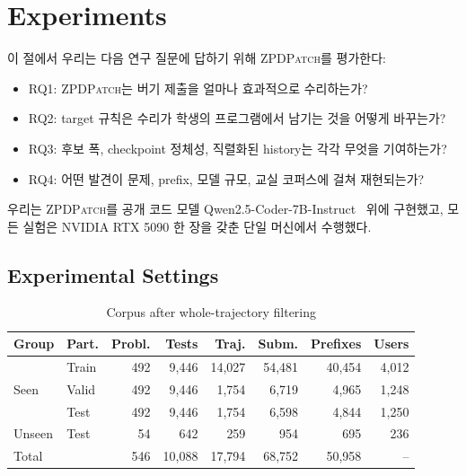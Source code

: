 \documentclass[10pt,conference]{IEEEtran}
\begin{document}
\section{Experiments}
\label{sec:experiment}
이 절에서 우리는 다음 연구 질문에 답하기 위해 \textsc{ZPDPatch}를 평가한다:
\begin{itemize}
\item RQ1: \textsc{ZPDPatch}는 버기 제출을 얼마나 효과적으로 수리하는가?
\item RQ2: target 규칙은 수리가 학생의 프로그램에서 남기는 것을 어떻게 바꾸는가?
\item RQ3: 후보 폭, checkpoint 정체성, 직렬화된 history는 각각 무엇을 기여하는가?
\item RQ4: 어떤 발견이 문제, prefix, 모델 규모, 교실 코퍼스에 걸쳐 재현되는가?
\end{itemize}
우리는 \textsc{ZPDPatch}를 공개 코드 모델 Qwen2.5-Coder-7B-Instruct~\cite{hui2024qwen2} 위에 구현했고, 모든 실험은 NVIDIA RTX 5090 한 장을 갖춘 단일 머신에서 수행했다.

\subsection{Experimental Settings}


\begin{table}[t]
\caption{Corpus after whole-trajectory filtering}
\label{tab:data}
\centering\scriptsize\setlength{\tabcolsep}{2.5pt}
\begin{tabular}{ll||rrrrrr}
\toprule
Group & Part. & Probl. & Tests & Traj. & Subm. & Prefixes & Users \\
\midrule
\multirow{3}{*}{Seen} & Train & 492 & 9,446 & 14,027 & 54,481 & 40,454 & 4,012 \\
 & Valid & 492 & 9,446 & 1,754 & 6,719 & 4,965 & 1,248 \\
 & Test & 492 & 9,446 & 1,754 & 6,598 & 4,844 & 1,250 \\
Unseen & Test & 54 & 642 & 259 & 954 & 695 & 236 \\
\midrule
Total & & 546 & 10,088 & 17,794 & 68,752 & 50,958 & -- \\
\bottomrule
\end{tabular}
\end{table}
\end{document}
